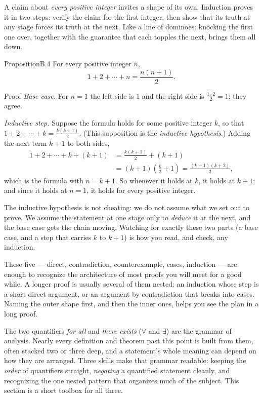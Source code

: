 \documentclass[a4paper,12pt,oneside]{memoir}
\begin{document}
 A claim about \emph{every positive integer} invites a shape of its own. Induction proves it in two steps: verify the claim for the first integer, then show that its truth at any stage forces its truth at the next. Like a line of dominoes: knocking the first one over, together with the guarantee that each topples the next, brings them all down.

\begin{envproposition}{Proposition}{B.4}{}
For every positive integer \(n\), \[ 1 + 2 + \cdots + n = \frac{n(n + 1)}{2}. \]
\end{envproposition}
\begin{envproof}{Proof}{}{}
\emph{Base case.} For \(n = 1\) the left side is \(1\) and the right side is \(\frac{1 \cdot 2}{2} = 1\); they agree.

\emph{Inductive step.} Suppose the formula holds for some positive integer \(k\), so that \(1 + 2 + \cdots + k = \frac{k(k + 1)}{2}\). (This supposition is the \emph{inductive hypothesis}.) Adding the next term \(k + 1\) to both sides, \[ \begin{aligned} 1 + 2 + \cdots + k + (k + 1) &= \frac{k(k + 1)}{2} + (k + 1) \\ &= (k + 1)\!\left(\frac{k}{2} + 1\right) = \frac{(k + 1)(k + 2)}{2}, \end{aligned} \] which is the formula with \(n = k + 1\). So whenever it holds at \(k\), it holds at \(k + 1\); and since it holds at \(n = 1\), it holds for every positive integer. \qedmark
\end{envproof}
The inductive hypothesis is not cheating: we do not assume what we set out to prove. We assume the statement at one stage only to \emph{deduce} it at the next, and the base case gets the chain moving. Watching for exactly these two parts (a base case, and a step that carries \(k\) to \(k + 1\)) is how you read, and check, any induction.

These five — direct, contradiction, counterexample, cases, induction — are enough to recognize the architecture of most proofs you will meet for a good while. A longer proof is usually several of them nested: an induction whose step is a short direct argument, or an argument by contradiction that breaks into cases. Naming the outer shape first, and then the inner ones, helps you see the plan in a long proof.


The two quantifiers \emph{for all} and \emph{there exists} (\(\forall\) and \(\exists\)) are the grammar of analysis. Nearly every definition and theorem past this point is built from them, often stacked two or three deep, and a statement’s whole meaning can depend on how they are arranged. Three skills make that grammar readable: keeping the \emph{order} of quantifiers straight, \emph{negating} a quantified statement cleanly, and recognizing the one nested pattern that organizes much of the subject. This section is a short toolbox for all three.
\end{document}
